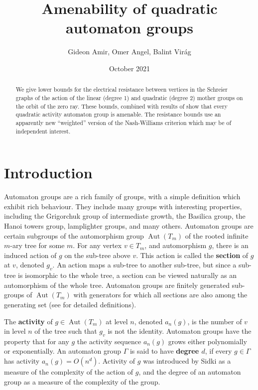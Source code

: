 \documentclass[12pt]{article}
\title{Amenability of quadratic automaton groups}
\author{Gideon Amir, Omer Angel, Balint Vir\'ag}
\date{October 2021}
\theoremstyle{definition}
\numberwithin{equation}{section}
\newcommand{\Aut}{\operatorname{Aut}}
\begin{document}
\maketitle

\begin{abstract}
  We give lower bounds for the electrical resistance between vertices in the Schreier graphs of the action of the linear (degree 1) and quadratic (degree 2) mother groups on the orbit of the zero ray.
  These bounds, combined with results of \cite{JNS} show that every quadratic activity automaton group is amenable.
  The resistance bounds use an apparently new ``weighted'' version of the Nash-Williams criterion which may be of independent interest.
\end{abstract}




\section{Introduction}

Automaton groups are a rich family of groups, with a simple definition which exhibit rich behaviour.
They include many groups with interesting properties, including
the Grigorchuk group of intermediate growth,
the Basilica group, the Hanoi towers group, lamplighter groups, and many others.
Automaton groups are certain subgroups of the automorphism group $\Aut(T_m)$ of the rooted infinite $m$-ary tree for some $m$.
For any vertex $v\in T_m$, and automorphism $g$, there is an induced action of $g$ on the sub-tree above $v$.
This action is called the \textbf{section} of $g$ at $v$, denoted $g_v$.
An action maps a sub-tree to another sub-tree, but since a sub-tree is isomorphic to the whole tree, a section can be viewed naturally as an automorphism of the whole tree.
Automaton groups are finitely generated sub-groups of $\Aut(T_m)$ with generators for which all sections are also among the generating set
(see \cite{Nek05} for detailed definitions).

The \textbf{activity} of $g\in\Aut(T_m)$ at level $n$, denoted $a_n(g)$, is the number of $v$ in level $n$ of the tree such that $g_v$ is not the identity.
Automaton groups have the property that for any $g$ the activity sequence $a_n(g)$ grows either polynomially or exponentially.
An automaton group $\Gamma$ is said to have \textbf{degree $d$}, if every $g\in\Gamma$ has activity $a_n(g) = O(n^d)$.
Activity of $g$ was introduced by Sidki \cite{Sidki00} as a measure of the complexity of the action of $g$, and the degree of an automaton group as a measure of the complexity of the group.
\end{document}
